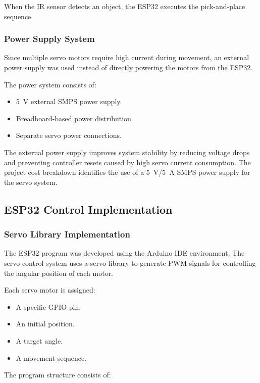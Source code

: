 When the IR sensor detects an object, the ESP32 executes the pick-and-place sequence.

\subsubsection{Power Supply System}

Since multiple servo motors require high current during movement, an external power supply was used instead of directly powering the motors from the ESP32.

The power system consists of:

\begin{itemize}
    \item 5~V external SMPS power supply.
    \item Breadboard-based power distribution.
    \item Separate servo power connections.
\end{itemize}

The external power supply improves system stability by reducing voltage drops and preventing controller resets caused by high servo current consumption. The project cost breakdown identifies the use of a 5~V/5~A SMPS power supply for the servo system.


\subsection{ESP32 Control Implementation}

\subsubsection{Servo Library Implementation}

The ESP32 program was developed using the Arduino IDE environment. The servo control system uses a servo library to generate PWM signals for controlling the angular position of each motor.

Each servo motor is assigned:

\begin{itemize}
    \item A specific GPIO pin.
    \item An initial position.
    \item A target angle.
    \item A movement sequence.
\end{itemize}

The program structure consists of:

